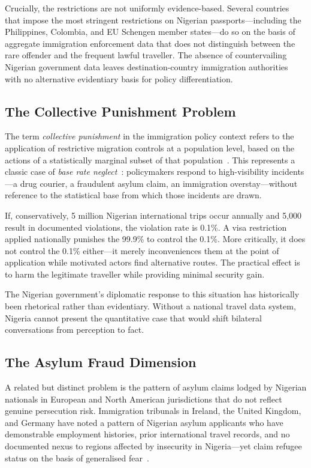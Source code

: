 \documentclass[11pt]{article}
\begin{document}
Crucially, the restrictions are not uniformly evidence-based.
Several countries that impose the most stringent restrictions on
Nigerian passports---including the Philippines, Colombia, and EU
Schengen member states---do so on the basis of aggregate immigration
enforcement data that does not distinguish between the rare offender
and the frequent lawful traveller. The absence of countervailing
Nigerian government data leaves destination-country immigration
authorities with no alternative evidentiary basis for policy
differentiation.

\subsection{The Collective Punishment Problem}

The term \textit{collective punishment} in the immigration policy context
refers to the application of restrictive migration controls at a
population level, based on the actions of a statistically marginal
subset of that population~\cite{castles2013}. This represents a classic
case of \textit{base rate neglect}~\cite{kahneman2011}: policymakers
respond to high-visibility incidents---a drug courier, a fraudulent
asylum claim, an immigration overstay---without reference to the
statistical base from which those incidents are drawn.

If, conservatively, 5 million Nigerian international trips occur
annually and 5,000 result in documented violations, the violation
rate is 0.1\%. A visa restriction applied nationally punishes the
99.9\% to control the 0.1\%. More critically, it does not control
the 0.1\% either---it merely inconveniences them at the point of
application while motivated actors find alternative routes.
The practical effect is to harm the legitimate traveller while
providing minimal security gain.

The Nigerian government's diplomatic response to this situation has
historically been rhetorical rather than evidentiary. Without a
national travel data system, Nigeria cannot present the quantitative
case that would shift bilateral conversations from perception to fact.

\subsection{The Asylum Fraud Dimension}

A related but distinct problem is the pattern of asylum claims lodged
by Nigerian nationals in European and North American jurisdictions
that do not reflect genuine persecution risk. Immigration tribunals in
Ireland, the United Kingdom, and Germany have noted a pattern of
Nigerian asylum applicants who have demonstrable employment histories,
prior international travel records, and no documented nexus to regions
affected by insecurity in Nigeria---yet claim refugee status on the
basis of generalised fear~\cite{eurostat2024,irishnat2023}.
\end{document}
